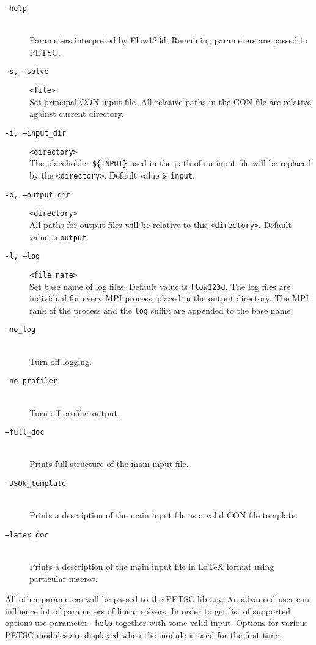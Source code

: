 \documentclass[12pt,a4paper]{report}
\begin{document}
\begin{description}
 \item[{\tt --help}] \hfill\\
        Parameters interpreted by Flow123d. Remaining parameters are passed to PETSC.
 \item[ {\tt -s, --solve} ] \verb'<file>' \hfill\\
 	 Set principal CON input file. All relative paths in the CON file are relative against current directory.
 \item[{\tt -i, --input\_dir}] \verb'<directory>' \hfill\\
 	The placeholder \verb"${INPUT}" %
  	used in the path of an input file will be replaced by the \verb'<directory>'. Default value is \verb'input'.
 \item[{\tt -o, --output\_dir}] \verb'<directory>' \hfill\\
 	All paths for output files will be relative to this \verb'<directory>'. Default value is \verb'output'.
 \item[{\tt -l, --log}] \verb'<file_name>' \hfill\\
 	Set base name of log files. Default value is \verb'flow123d'. The log files are individual for every MPI process, placed in the output directory. 
 	The MPI rank of the process and the \verb'log' suffix are appended to the base name.
 \item[{\tt --no\_log}] \hfill\\
        Turn off logging.
 \item[{\tt --no\_profiler}] \hfill\\
        Turn off profiler output.
 \item[{\tt --full\_doc}] \hfill\\
        Prints full structure of the main input file.
 \item[{\tt --JSON\_template}] \hfill\\
        Prints a description of the main input file as a valid CON file template.
 \item[{\tt --latex\_doc}] \hfill\\ 
        Prints a description of the main input file in LaTeX format using particular macros.
\end{description}
All other parameters will be passed to the PETSC library. An advanced user can influence lot of parameters of linear solvers. In order to get list of supported options 
use parameter \verb'-help' together with some valid input. Options for various PETSC modules are displayed when the module is used for the first time.
\end{document}
